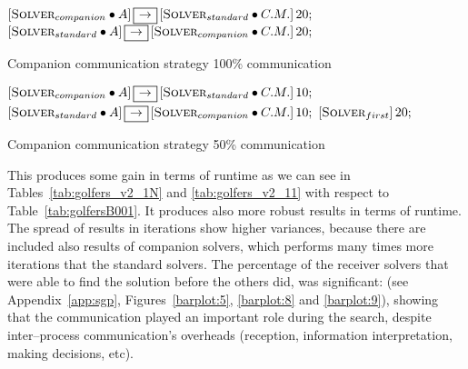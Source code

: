 \begin{algorithm}[h]
\dontprintsemicolon
\SetNoline
$\left[\eqsolverposl{companion}\posldot A\right] \onetoone \left[\eqsolverposl{standard}\posldot C.M.\right]20;$\;
$\left[\eqsolverposl{standard}\posldot A\right] \onetoone \left[\eqsolverposl{companion}\posldot C.M.\right]20;$
\caption{Companion communication strategy 100\% communication}\label{comm:golfers_v2_100}
\end{algorithm}

\begin{algorithm}[h]
\dontprintsemicolon
\SetNoline
$\left[\eqsolverposl{companion}\posldot A\right] \onetoone \left[\eqsolverposl{standard}\posldot C.M.\right]10;$\;
$\left[\eqsolverposl{standard}\posldot A\right] \onetoone \left[\eqsolverposl{companion}\posldot C.M.\right]10;$\;
$\left[\textbf{{\sc Solver}}_{first}\right]20;$\;
\caption{Companion communication strategy 50\% communication}\label{comm:golfers_v2_50}
\end{algorithm}

This \commstr{} produces some gain in terms of runtime as we can see in Tables~\ref{tab:golfers_v2_1N} and \ref{tab:golfers_v2_11} with respect to Table~\ref{tab:golfersB001}. It produces also more robust results in terms of runtime. The spread of results in iterations show higher variances, because there are included also results of companion solvers, which performs many times more iterations that the standard solvers. The percentage of the receiver solvers that were able to find the solution before the others did, was significant:  (see Appendix~\ref{app:sgp}, Figures~\ref{barplot:5}, \ref{barplot:8} and \ref{barplot:9}), showing that the communication played an important role during the search, despite inter--process communication's overheads (reception, information interpretation, making decisions, etc).

\begin{table}
\captionsetup{belowskip=6pt,aboveskip=6pt}
\centering 
\renewcommand{\arraystretch}{1}
\caption{Companion \commstr{} with communication \oneTn}
\label{tab:golfers_v2_1N}
\end{table}

